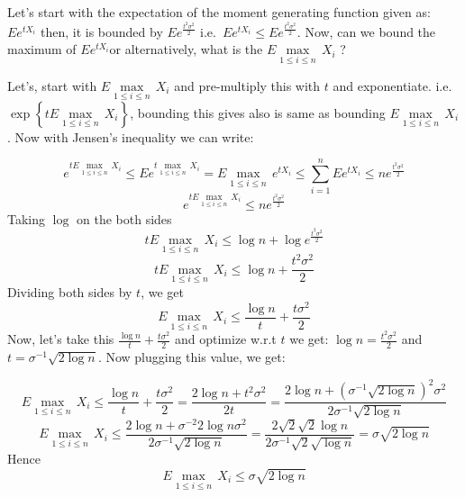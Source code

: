\documentclass[
]{article}
\begin{document}
Let's start with the expectation of the moment generating function given
as: \(E{{e}^{t{{X}_{i}}}}\) then, it is bounded by
\(E{{e}^{\frac{{{t}^{2}}{{\sigma }^{2}}}{2}}}\)
i.e.~\(E{{e}^{t{{X}_{i}}}}\le E{{e}^{\frac{{{t}^{2}}{{\sigma }^{2}}}{2}}}\).
Now, can we bound the maximum of \(E{{e}^{t{{X}_{i}}}}\)or
alternatively, what is the
\(E\underset{1\le i\le n}{\mathop{\max }}\,{{X}_{i}}\) ?

Let's, start with \(E\underset{1\le i\le n}{\mathop{\max }}\,{{X}_{i}}\)
and pre-multiply this with \(t\) and exponentiate.
i.e.~\(\exp \left\{ tE\underset{1\le i\le n}{\mathop{\max }}\,{{X}_{i}} \right\}\),
bounding this gives also is same as bounding
\(E\underset{1\le i\le n}{\mathop{\max }}\,{{X}_{i}}\). Now with
Jensen's inequality we can write:

\[{{e}^{tE\underset{1\le i\le n}{\mathop{\max }}\,{{X}_{i}}}}\le E{{e}^{t\underset{1\le i\le n}{\mathop{\max }}\,{{X}_{i}}}}=E\underset{1\le i\le n}{\mathop{\max }}\,{{e}^{t{{X}_{i}}}}\le \sum\limits_{i=1}^{n}{E{{e}^{t{{X}_{i}}}}}\le n{{e}^{\frac{{{t}^{2}}{{\sigma }^{2}}}{2}}}\]
\[{{e}^{tE\underset{1\le i\le n}{\mathop{\max }}\,{{X}_{i}}}}\le n{{e}^{\frac{{{t}^{2}}{{\sigma }^{2}}}{2}}}\]
Taking \(\log\) on the both sides
\[tE\underset{1\le i\le n}{\mathop{\max }}\,{{X}_{i}}\le \log n+\log {{e}^{\frac{{{t}^{2}}{{\sigma }^{2}}}{2}}}\]
\[tE\underset{1\le i\le n}{\mathop{\max }}\,{{X}_{i}}\le \log n+\frac{{{t}^{2}}{{\sigma }^{2}}}{2}\]
Dividing both sides by \(t\), we get
\[E\underset{1\le i\le n}{\mathop{\max }}\,{{X}_{i}}\le \frac{\log n}{t}+\frac{t{{\sigma }^{2}}}{2}\]
Now, let's take this \(\frac{\log n}{t}+\frac{t{{\sigma }^{2}}}{2}\) and
optimize w.r.t \(t\) we get:
\(\log n=\frac{{{t}^{2}}{{\sigma }^{2}}}{2}\) and
\(t={{\sigma }^{-1}}\sqrt{2\log n}\). Now plugging this value, we get:

\[E\underset{1\le i\le n}{\mathop{\max }}\,{{X}_{i}}\le \frac{\log n}{t}+\frac{t{{\sigma }^{2}}}{2}=\frac{2\log n+{{t}^{2}}{{\sigma }^{2}}}{2t}=\frac{2\log n+{{\left( {{\sigma }^{-1}}\sqrt{2\log n} \right)}^{2}}{{\sigma }^{2}}}{2{{\sigma }^{-1}}\sqrt{2\log n}}\]
\[E\underset{1\le i\le n}{\mathop{\max }}\,{{X}_{i}}\le \frac{2\log n+{{\sigma }^{-2}}2\log n{{\sigma }^{2}}}{2{{\sigma }^{-1}}\sqrt{2\log n}}=\frac{2\sqrt{2}\sqrt{2}\log n}{2{{\sigma }^{-1}}\sqrt{2}\sqrt{\log n}}=\sigma \sqrt{2\log n}\]
Hence
\[E\underset{1\le i\le n}{\mathop{\max }}\,{{X}_{i}}\le \sigma \sqrt{2\log n}\]
\end{document}
